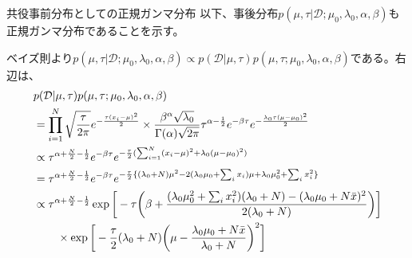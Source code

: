 \documentclass[aspectratio=169,unicode,dvipdfmx,14pt]{beamer}
\begin{document}
\begin{frame}{共役事前分布としての正規ガンマ分布}
\FontMath
以下、事後分布$p(\mu,\tau|\mathcal{D};\mu_0, \lambda_0, \alpha, \beta)$も正規ガンマ分布であることを示す。

ベイズ則より$p(\mu,\tau|\mathcal{D};\mu_0, \lambda_0, \alpha, \beta)
\propto p(\mathcal{D}|\mu,\tau) p(\mu, \tau ; \mu_0, \lambda_0, \alpha, \beta)$である。右辺は、
\begin{align}
& p(\mathcal{D}|\mu,\tau) p(\mu, \tau ; \mu_0, \lambda_0, \alpha, \beta)
\notag \\ & =
\prod_{i=1}^N \sqrt{\frac{\tau}{2\pi}}e^{ - \frac{  \tau(x_i - \mu)^2 }{2} }
\times
\frac{\beta^\alpha\sqrt{\lambda_0}}{\Gamma(\alpha)\sqrt{2\pi}}
\tau^{\alpha-\frac{1}{2}}e^{-\beta\tau}e^{-\frac{\lambda_0\tau(\mu - \mu_0)^2}{2}}
\notag \\ & \propto
\tau^{\alpha + \frac{N}{2} - \frac{1}{2}}e^{-\beta\tau}
e^{ - \frac{\tau}{2} ( \sum_{i=1}^N (x_i - \mu)^2 + \lambda_0(\mu - \mu_0)^2) }
\notag \\ & =
\tau^{\alpha + \frac{N}{2} - \frac{1}{2}}e^{-\beta\tau}
e^{ - \frac{\tau}{2} \{ ( \lambda_0 + N ) \mu^2 - 2 ( \lambda_0 \mu_0 + \sum_i x_i) \mu + \lambda_0 \mu_0^2 + \sum_i x_i^2 \} }
\notag \\ & \propto
\tau^{\alpha + \frac{N}{2} - \frac{1}{2}}
\exp \bigg[ - \tau \bigg( \beta + \frac{ (\lambda_0 \mu_0^2 + \sum_i x_i^2)( \lambda_0 + N )
- ( \lambda_0 \mu_0 + N\bar{x} )^2 }{ 2( \lambda_0 + N ) }
\bigg) \bigg]
\notag \\ & \mbox{ \hspace{ .2in} }
\times \exp \bigg[ - \frac{\tau}{2} ( \lambda_0 + N ) \bigg( \mu - \frac{ \lambda_0 \mu_0 + N\bar{x} }{ \lambda_0 + N } \bigg)^2 \bigg]
\end{align}
\end{frame}
\end{document}
